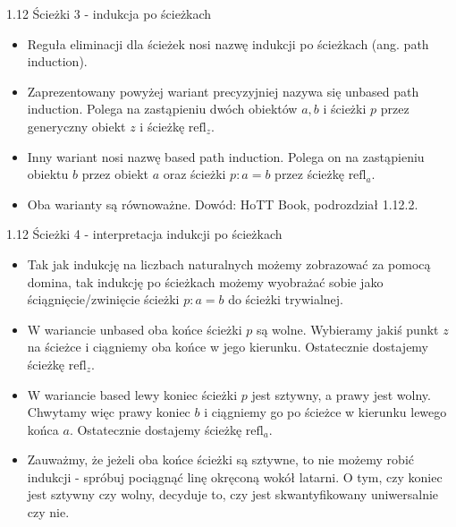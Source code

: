 \documentclass{beamer}
\newcommand{\refl}[1]{\text{refl}_{#1}}
\begin{document}
\begin{frame}{1.12 Ścieżki 3 - indukcja po ścieżkach}
\begin{itemize}
	\item Reguła eliminacji dla ścieżek nosi nazwę indukcji po ścieżkach (ang. path induction).
	\item Zaprezentowany powyżej wariant precyzyjniej nazywa się unbased path induction. Polega na zastąpieniu dwóch obiektów $a, b$ i ścieżki $p$ przez generyczny obiekt $z$ i ścieżkę $\refl{z}$.
	\item Inny wariant nosi nazwę based path induction. Polega on na zastąpieniu obiektu $b$ przez obiekt $a$ oraz ścieżki $p : a = b$ przez ścieżkę $\refl{a}$.
	\item Oba warianty są równoważne. Dowód: HoTT Book, podrozdział 1.12.2.
\end{itemize}
\end{frame}

\begin{frame}{1.12 Ścieżki 4 - interpretacja indukcji po ścieżkach}
\begin{itemize}
	\item Tak jak indukcję na liczbach naturalnych możemy zobrazować za pomocą domina, tak indukcję po ścieżkach możemy wyobrażać sobie jako ściągnięcie/zwinięcie ścieżki $p : a = b$ do ścieżki trywialnej.
	\item W wariancie unbased oba końce ścieżki $p$ są wolne. Wybieramy jakiś punkt $z$ na ścieżce i ciągniemy oba końce w jego kierunku. Ostatecznie dostajemy ścieżkę $\refl{z}$.
	\item W wariancie based lewy koniec ścieżki $p$ jest sztywny, a prawy jest wolny. Chwytamy więc prawy koniec $b$ i ciągniemy go po ścieżce w kierunku lewego końca $a$. Ostatecznie dostajemy ścieżkę $\refl{a}$.
	\item Zauważmy, że jeżeli oba końce ścieżki są sztywne, to nie możemy robić indukcji - spróbuj pociągnąć linę okręconą wokół latarni. O tym, czy koniec jest sztywny czy wolny, decyduje to, czy jest skwantyfikowany uniwersalnie czy nie.
\end{itemize}
\end{frame}
\end{document}
